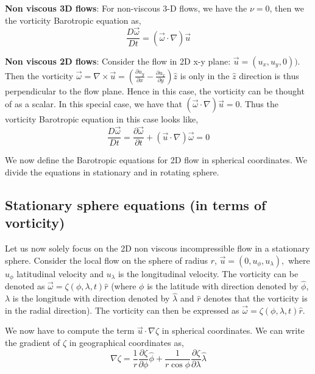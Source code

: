 \documentclass[aps,pra,a4paper,twocolumn,longbibliography,groupedaddress]{revtex4-2}
\begin{document}
\noindent \textbf{Non viscous 3D flows}: For non-viscous 3-D flows, we have the $\nu = 0$, then we the vorticity Barotropic equation as,
\begin{equation}
     \frac{D\vec{\omega}}{Dt} = (\vec{\omega}\cdot \nabla)\vec{u}
\end{equation}

\noindent \textbf{Non viscous 2D flows}: Consider the flow in 2D x-y plane: $\vec{u} = (u_x, u_y, 0))$. Then the vorticity $\vec{\omega} = \nabla \times \vec{u} = \left(\frac{\partial u_y}{\partial x} - \frac{\partial u_x}{\partial y}\right)\hat{z}$ is only in the $\hat{z}$ direction is thus perpendicular to the flow plane. Hence in this case, the vorticity can be thought of as a scalar. 
In this special case, we have that $(\vec{\omega}\cdot \nabla)\vec{u} = 0$. Thus the vorticity Barotropic equation in this case looks like,
\begin{equation}
    \frac{D\vec{\omega}}{Dt} = \frac{\partial \vec{\omega}}{\partial t} + (\vec{u} \cdot \nabla)\vec{\omega} = 0
\end{equation}


We now define the Barotropic equations for 2D flow in spherical coordinates. We divide the equations in stationary and in rotating sphere.

\subsection{Stationary sphere equations (in terms of vorticity)}

Let us now solely focus on the 2D non viscous incompressible flow in a stationary sphere. Consider the local flow on the sphere of radius $r$, $\vec{u} = (0, u_{\phi}, u_{\lambda}),$ where $u_{\phi}$ latitudinal velocity and $u_{\lambda}$ is the longitudinal velocity. The vorticity can be denoted as $\vec{\omega} = \zeta(\phi, \lambda, t)\hat{r}$ (where $\phi$ is the latitude with direction denoted by $\hat{\phi}$, $\lambda$ is the longitude with direction denoted by $\hat{\lambda}$ and $\hat{r}$ denotes that the vorticity is in the radial direction). The vorticity can then be expressed as $\vec{\omega} = \zeta(\phi, \lambda, t)\hat{r}$.

We now have to compute the term $\vec{u} \cdot \nabla \zeta$ in spherical coordinates. We can write the gradient of $\zeta$ in geographical coordinates as,
\begin{equation}
    \nabla \zeta = \frac{1}{r}\frac{\partial \zeta}{\partial \phi}\hat{\phi} + \frac{1}{r\cos\phi}\frac{\partial \zeta}{\partial \lambda} \hat{\lambda}
\end{equation}
\end{document}
